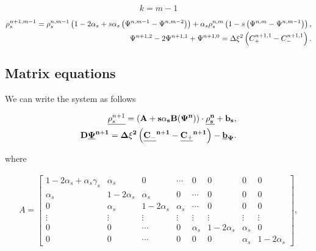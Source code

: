 $$ k = m-1 $$

\begin{align}
    \rho_s^{n+1, m-1} = \rho_s^{n,m-1} \left({1 - 2 \alpha_s + s \alpha_s \left({\Psi^{n, m-1} - \Psi^{n, m-2}}\right)}\right) + \alpha_s \rho_s^{n, m} \left({1 - s \left({\Psi^{n,m} - \Psi^{n,m-1}}\right)}\right),\\
    \Psi^{n+1, 2} - 2\Psi^{n+1,1} + \Psi^{n+1, 0} = \Delta \xi^2 \left({C_+^{n+1, 1} - C_-^{n+1, 1}}\right).  
\end{align}

\subsection{Matrix equations}

We can write the system as follows

\begin{align}
\underline{\rho_s^{n+1}} = (\bf{A} + s\alpha_s\bf{B}(\Psi^{n}) ) \cdot \underline{\rho_s^{n}} + \bf{b_s},\\
\bf{D} \underline{\Psi}^{n+1} = \Delta \xi ^2\left({\underline{C_-}^{n+1} - \underline{C_+}^{n+1}}\right)- \underline{b}_{\Psi}.
\end{align}


where

\begin{align}
A = \begin{bmatrix}
    1 - 2 \alpha_s + \alpha_s \gamma_s   &  \alpha_s   & 0  &   \cdots & 0   &   0   &   0   &   0 \\
    \alpha_s    &   1 - 2 \alpha_s       &  \alpha_s   & 0  & \cdots   & 0   &   0   &   0 \\
    0         & \alpha_s               &  1 - 2 \alpha_s  & \alpha_s   & \cdots   &   0   &   0   &   0 \\
    \vdots    &  \vdots              &\vdots          &  \vdots  & \vdots   &\vdots & \vdots & \vdots \\ 
    0         &  0                   &  \cdots        &  0       &  \alpha_s    &  1-2\alpha_s &    \alpha_s   &    0 \\
0         &  0                   &  \cdots        &  0           &  0         &     0      &  \alpha_s    &  1-2\alpha_s 
\end{bmatrix},
\end{align}


